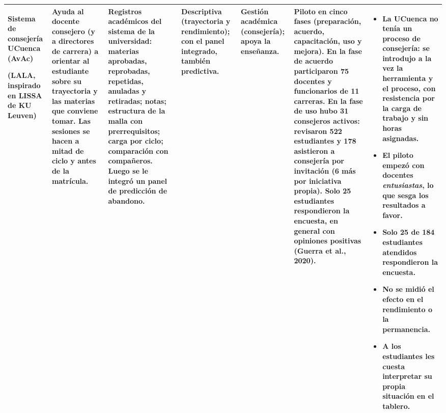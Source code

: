 \documentclass[10pt]{article}
\begin{document}
{\begin{longtable}{P{2.2cm} P{3.4cm} P{3.6cm} P{2.7cm} P{2.2cm} P{4.3cm} P{5.0cm}}
\textbf{Sistema de consejería UCuenca (AvAc)}\par (LALA, inspirado en LISSA de KU Leuven)
& Ayuda al \textbf{docente consejero} (y a directores de carrera) a orientar al estudiante sobre su trayectoria y las materias que conviene tomar. Las sesiones se hacen a mitad de ciclo y antes de la matrícula.
& Registros académicos del sistema de la universidad: materias aprobadas, reprobadas, repetidas, anuladas y retiradas; notas; estructura de la malla con prerrequisitos; carga por ciclo; comparación con compañeros. Luego se le integró un panel de predicción de abandono.
& Descriptiva (trayectoria y rendimiento); con el panel integrado, también predictiva.
& Gestión académica (consejería); apoya la enseñanza.
& Piloto en cinco fases (preparación, acuerdo, capacitación, uso y mejora). En la fase de acuerdo participaron 75 docentes y funcionarios de 11 carreras. En la fase de uso hubo 31 consejeros activos: revisaron 522 estudiantes y 178 asistieron a consejería por invitación (6 más por iniciativa propia). Solo 25 estudiantes respondieron la encuesta, en general con opiniones positivas (Guerra et al., 2020).
& \begin{itemize}
\item La UCuenca no tenía un proceso de consejería: se introdujo a la vez la herramienta y el proceso, con resistencia por la carga de trabajo y sin horas asignadas.
\item El piloto empezó con docentes \emph{entusiastas}, lo que sesga los resultados a favor.
\item Solo 25 de 184 estudiantes atendidos respondieron la encuesta.
\item No se midió el efecto en el rendimiento o la permanencia.
\item A los estudiantes les cuesta interpretar su propia situación en el tablero.
\end{itemize}\\
\midrule


\end{longtable}}
\end{document}
